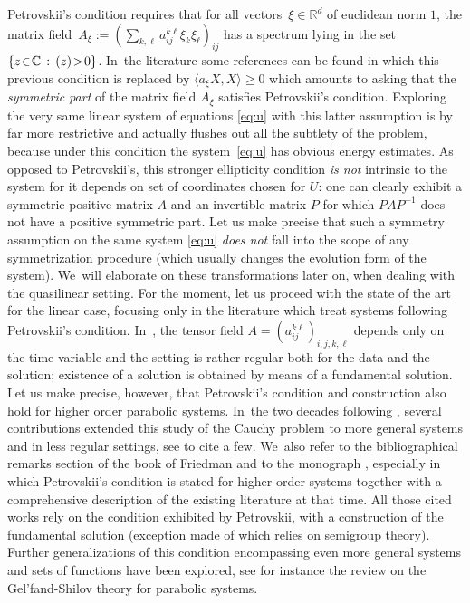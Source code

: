 \documentclass[JEP,XML,SOM,Unicode,published]{cedram}
\let\Re\relax
\DeclareMathOperator{\Re}{Re}
\theoremstyle{definition}
\newcommand\R{\mathbb{R}}
\begin{document}
Petrovskii's condition requires that for all vectors~$\xi\in\R^d$ of euclidean norm $1$, the matrix field~$A_\xi:= (\sum_{k,\ell} a_{ij}^{k\ell} \xi_k\xi_\ell)_{ij}$ has a spectrum lying in the set~\hbox{$\{z\!\in\!\mathbb{C}\,:\,\Re(z)\!>\!0\}$}. In~the literature some references can be found in which this previous condition is replaced by $\langle a_\xi X,X\rangle \geq 0$ which amounts to asking that the \emph{symmetric part} of the matrix field $A_\xi$ satisfies Petrovskii's condition. Exploring the very same linear system of equations \eqref{eq:u} with this latter assumption is by far more restrictive and actually flushes out all the subtlety of the problem, because under this condition the system~\eqref{eq:u} has obvious energy estimates. {As opposed to Petrovskii's, this stronger ellipticity condition \emph{is not} intrinsic to the system for it depends on set of coordinates chosen for $U$: one can clearly exhibit a symmetric positive matrix $A$ and an invertible matrix $P$ for which $PAP^{-1}$ does not have a positive symmetric part. Let us make precise that such a symmetry assumption on the same system \eqref{eq:u} \emph{does not} fall into the scope of any symmetrization procedure (which usually changes the evolution form of the system). We~will elaborate on these transformations later on, when dealing with the quasilinear setting.} For the moment, let us proceed with the state of the art for the linear case, focusing only in the literature which treat systems following Petrovskii's condition. In~\cite{petrorigine}, the tensor field $A=(a_{ij}^{k\ell})_{i,j,k,\ell}$ depends only on the time variable and the setting is rather regular both for the data and the solution; existence of a solution is obtained by means of a fundamental solution. Let us make precise, however, that Petrovskii's condition and construction also hold for higher order parabolic systems. In~the two decades following \cite{petrorigine}, several contributions extended this study of the Cauchy problem to more general systems and in less regular settings, see \cite{aronson,lady,eidelman} to cite a few. We~also refer to the bibliographical remarks section of the book \cite{friedman} of Friedman and to the monograph \cite{ladyfat}, {especially \cite[Chap.\,VII, \S8]{ladyfat} in which Petrovskii's condition is stated for higher order systems together with a comprehensive description of the existing literature at that time}. All those cited works rely on the condition exhibited by Petrovskii, with a construction of the fundamental solution (exception made of \cite{mizo} which relies on semigroup theory). Further generalizations of this condition encompassing even more general systems and sets of functions have been explored, see for instance the review \cite{pala} on the Gel'fand-Shilov theory for parabolic systems.
\end{document}
